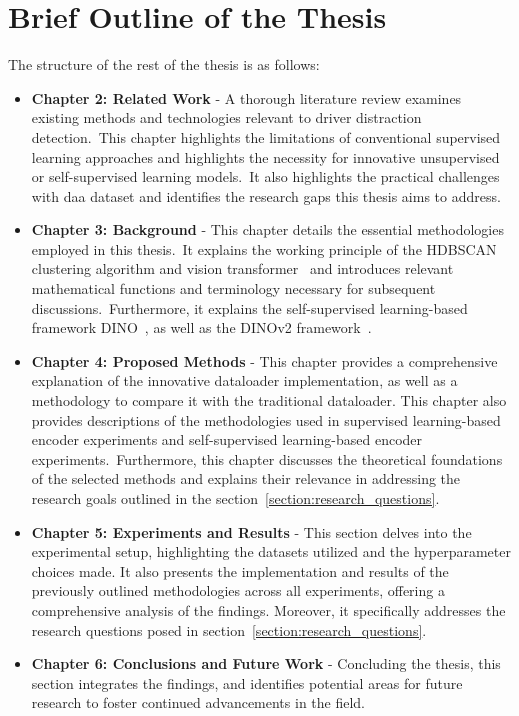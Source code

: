 \section{Brief Outline of the Thesis}
The structure of the rest of the thesis is as follows:
\begin{itemize}
    \item \textbf{Chapter 2: Related Work} - A thorough literature review examines existing methods and technologies relevant to driver distraction detection.~This chapter highlights the limitations of conventional supervised learning approaches and highlights the necessity for innovative unsupervised or self-supervised learning models.~It also highlights the practical challenges with \gls{daa} dataset and identifies the research gaps this thesis aims to address.
    
    \item \textbf{Chapter 3: Background} - This chapter details the essential methodologies employed in this thesis.~It explains the working principle of the HDBSCAN~\citep{HDBSCAN_algo_campello2013density} clustering algorithm and vision transformer~\cite{Vit_Paper_Dosovitskiy2020AnII} and introduces relevant mathematical functions and terminology necessary for subsequent discussions.~Furthermore, it explains the self-supervised learning-based framework DINO~\citep{dino_caron2021emerging}, as well as the DINOv2 framework~\citep{dinov2_oquab2023dinov2}.
    
    \item \textbf{Chapter 4: Proposed Methods} - This chapter provides a comprehensive explanation of the innovative dataloader implementation, as well as a methodology to compare it with the traditional dataloader. This chapter also provides descriptions of the methodologies used in supervised learning-based encoder experiments and self-supervised learning-based encoder experiments.~Furthermore, this chapter discusses the theoretical foundations of the selected methods and explains their relevance in addressing the research goals outlined in the section~\ref{section:research_questions}.
    
    \item \textbf{Chapter 5: Experiments and Results} - This section delves into the experimental setup, highlighting the datasets utilized and the hyperparameter choices made. It also presents the implementation and results of the previously outlined methodologies across all experiments, offering a comprehensive analysis of the findings. Moreover, it specifically addresses the research questions posed in section~\ref{section:research_questions}.
    
    \item \textbf{Chapter 6: Conclusions and Future Work} - Concluding the thesis, this section integrates the findings, and identifies potential areas for future research to foster continued advancements in the field.
\end{itemize}

